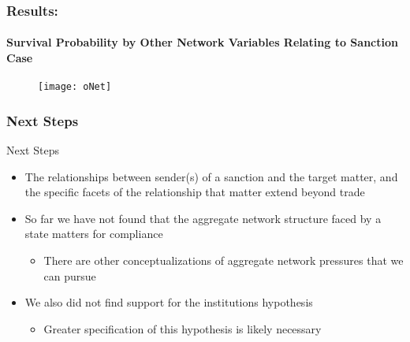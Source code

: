 \documentclass{beamer}
\begin{document}
\begin{frame}
\frametitle{Results:}	
\framesubtitle{Survival Probability by Other Network Variables Relating to Sanction Case}

\begin{figure}[ht]
	\centering
	\texttt{[image: oNet]}
\end{figure}

\end{frame}

\begin{frame}
\frametitle{Next Steps}

Next Steps
\begin{itemize}
	\item The relationships between sender(s) of a sanction and the target matter, and the specific facets of the relationship that matter extend beyond trade
	\item So far we have not found that the aggregate network structure faced by a state matters for compliance
	\begin{itemize}
		\item There are other conceptualizations of aggregate network pressures that we can pursue
	\end{itemize}
	\item We also did not find support for the institutions hypothesis
	\begin{itemize}
		\item Greater specification of this hypothesis is likely necessary
	\end{itemize}
\end{itemize}
\end{frame}

\end{document}
